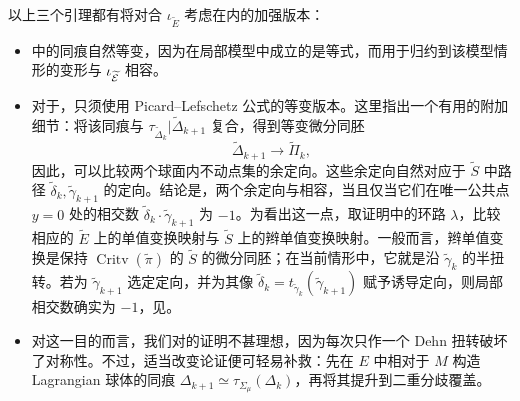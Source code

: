 \begin{note}\label{st:18.5}
以上三个引理都有将对合 $\iota_{\widetilde E}$ 考虑在内的加强版本：
\begin{itemize}
\item {}中的同痕自然等变，因为在局部模型中成立的是等式，而用于归约到该模型情形的变形与 $\iota_{\widetilde{\mathcal E}}$ 相容。
\item 对于，只须使用 Picard–Lefschetz 公式的等变版本。这里指出一个有用的附加细节：将该同痕与 $\tau_{\widetilde\Delta_k}|\widetilde\Delta_{k+1}$ 复合，得到等变微分同胚
\begin{equation}\label{eq:18.14}
\widetilde\Delta_{k+1}\longrightarrow\widetilde\Pi_k,
\end{equation}
因此，可以比较两个球面内不动点集的余定向。这些余定向自然对应于 $\widetilde S$ 中路径 $\widetilde\delta_k,\widetilde\gamma_{k+1}$ 的定向。结论是，两个余定向与相容，当且仅当它们在唯一公共点 $y=0$ 处的相交数 $\widetilde\delta_k\cdot\widetilde\gamma_{k+1}$ 为 $-1$。为看出这一点，取证明中的环路 $\lambda$，比较相应的 $\widetilde E$ 上的单值变换映射与
$\widetilde S$ 上的辫单值变换映射。一般而言，辫单值变换是保持 $\operatorname{Critv}(\widetilde\pi)$ 的 $\widetilde S$ 的微分同胚；在当前情形中，它就是沿 $\widetilde\gamma_k$ 的半扭转。若为 $\widetilde\gamma_{k+1}$ 选定定向，并为其像 $\widetilde\delta_k=t_{\widetilde\gamma_k}(\widetilde\gamma_{k+1})$ 赋予诱导定向，则局部相交数确实为 $-1$，见。
\item 对这一目的而言，我们对的证明不甚理想，因为每次只作一个 Dehn 扭转破坏了对称性。不过，适当改变论证便可轻易补救：先在 $E$ 中相对于 $M$ 构造 Lagrangian 球体的同痕 $\Delta_{k+1}\simeq\tau_{\Sigma_\mu}(\Delta_k)$，再将其提升到二重分歧覆盖。
\end{itemize}
\end{note}
